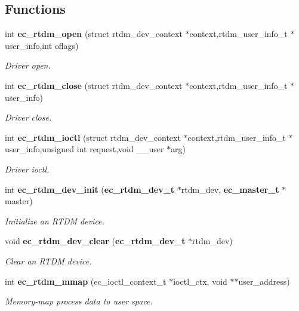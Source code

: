 \subsection*{\-Functions}
\begin{DoxyCompactItemize}
\item 
int {\bf ec\-\_\-rtdm\-\_\-open} (struct rtdm\-\_\-dev\-\_\-context $\ast$context,rtdm\-\_\-user\-\_\-info\-\_\-t $\ast$user\-\_\-info,int oflags)
\begin{DoxyCompactList}\small\item\em \-Driver open. \end{DoxyCompactList}\item 
int {\bf ec\-\_\-rtdm\-\_\-close} (struct rtdm\-\_\-dev\-\_\-context $\ast$context,rtdm\-\_\-user\-\_\-info\-\_\-t $\ast$user\-\_\-info)
\begin{DoxyCompactList}\small\item\em \-Driver close. \end{DoxyCompactList}\item 
int {\bf ec\-\_\-rtdm\-\_\-ioctl} (struct rtdm\-\_\-dev\-\_\-context $\ast$context,rtdm\-\_\-user\-\_\-info\-\_\-t $\ast$user\-\_\-info,unsigned int request,void \-\_\-\-\_\-user $\ast$arg)
\begin{DoxyCompactList}\small\item\em \-Driver ioctl. \end{DoxyCompactList}\item 
int {\bf ec\-\_\-rtdm\-\_\-dev\-\_\-init} ({\bf ec\-\_\-rtdm\-\_\-dev\-\_\-t} $\ast$rtdm\-\_\-dev, {\bf ec\-\_\-master\-\_\-t} $\ast$master)
\begin{DoxyCompactList}\small\item\em \-Initialize an \-R\-T\-D\-M device. \end{DoxyCompactList}\item 
void {\bf ec\-\_\-rtdm\-\_\-dev\-\_\-clear} ({\bf ec\-\_\-rtdm\-\_\-dev\-\_\-t} $\ast$rtdm\-\_\-dev)
\begin{DoxyCompactList}\small\item\em \-Clear an \-R\-T\-D\-M device. \end{DoxyCompactList}\item 
int {\bf ec\-\_\-rtdm\-\_\-mmap} (ec\-\_\-ioctl\-\_\-context\-\_\-t $\ast$ioctl\-\_\-ctx, void $\ast$$\ast$user\-\_\-address)
\begin{DoxyCompactList}\small\item\em \-Memory-\/map process data to user space. \end{DoxyCompactList}\end{DoxyCompactItemize}


